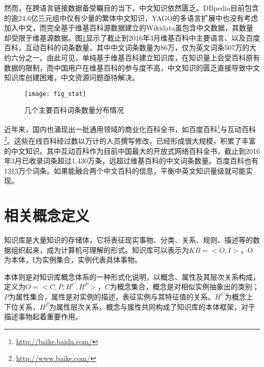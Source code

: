 然而，在跨语言链接数据备受瞩目的当下，中文知识依然匮乏。DBpedia目前包含的逾24.6亿三元组中仅有少量的繁体中文知识，YAGO的多语言扩展中也没有考虑加入中文，而完全基于维基百科源数据建立的Wikidata虽包含中文数据，其数量却受限于维基源数据。图\ref{fig:wiki-stat}显示了截止到2016年3月维基百科中主要语言、以及百度百科，互动百科的词条数量，其中中文词条数量为86万，仅为英文词条507万的大约六分之一。由此可见，单纯基于维基百科建立知识库，在知识量上会受百科原有数据的限制，而中国用户在维基百科的参与度不高，中文知识的匮乏直接导致中文知识库创建困难，中文资源问题亟待解决。

\begin{figure}[h]
  \centering
  \texttt{[image: fig\_stat]}
  \caption{几个主要百科词条数量分布情况}
  \label{fig:wiki-stat}
\end{figure}

近年来，国内也涌现出一批通用领域的商业化百科全书，如百度百科\footnote{\url{http://baike.baidu.com/}}与互动百科\footnote{\url{http://www.baike.com/}}。这些在线百科经过数以万计的人员撰写修改，已经形成很大规模，积累了丰富的中文知识。其中互动百科作为目前中国最大的开放式网络百科全书，截止到2016年3月已收录词条超过1,430万条，远超过维基百科的中文词条数量。百度百科也有1313万个词条。如果能融合两个中文百科的信息，平衡中英文知识量级就可能实现。


\section{相关概念定义}
{\heiti 知识库}是大量知识的存储体，它将表征现实事物、分类、关系、规则、描述等的数据组织起来，成为计算机可理解的形式。知识库可以表示为$KB=<O,I>$，O为本体，I为实例集合，实例代表具体事物。

{\heiti 本体}则是对知识库概念体系的一种形式化说明，以概念、属性及其层次关系构成，定义为$O=<C,P,H^C,H^P>$，$C$为概念集合，概念是对相似实例抽象出的类别；$P$为属性集合，属性是对实例的描述，表征实例与其特征值的关系。$H^C$为概念上下位关系，$H^P$为属性层次关系，概念与属性共同构成了知识库的本体框架，对于描述事物起着重要作用。

